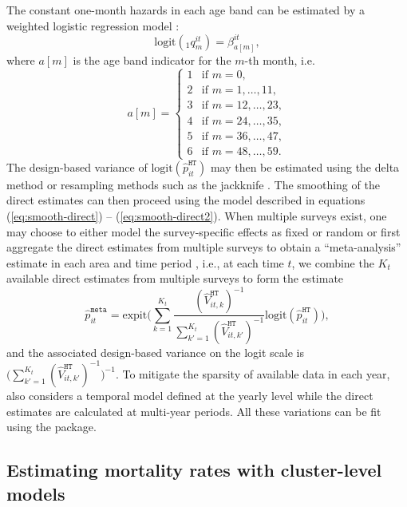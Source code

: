 The constant one-month hazards in each age band can be estimated by a weighted logistic regression model \citep{binder_83}:
\begin{equation}
\mbox{logit}\left(
{}_{1}{q}^{it}_{m}
\right) = \beta_{a[m]}^{it},
\end{equation}
where \(a[m]\) is the age band indicator for the \(m\)-th month, i.e.
\begin{equation}
a[m] = \left\{
\begin{array}{ll}
1 & \mbox{if }m=0,\\
2 & \mbox{if }m=1,\dots,11,\\
3 & \mbox{if }m=12,\dots,23,\\
4 & \mbox{if }m=24,\dots,35,\\
5 & \mbox{if }m=36,\dots,47,\\
6 & \mbox{if }m=48,\dots,59.
\end{array}
\right.
\label{eq:am}
\end{equation}
The design-based variance of \(\mbox{logit}(\hat p_{it}^{\texttt{HT}})\) may then be estimated using the delta method or resampling methods such as the jackknife \citep{pedersenandliu_2012}. The smoothing of the direct estimates can then proceed using the model described in equations (\ref{eq:smooth-direct}) -- (\ref{eq:smooth-direct2}). When multiple surveys exist, one may choose to either model the survey-specific effects as fixed or random \citep{mercer_etal_15} or first aggregate the direct estimates from multiple surveys to obtain a ``meta-analysis'' estimate in each area and time period \citep{li_etal_19}, i.e., at each time \(t\), we combine the \(K_t\) available direct estimates from multiple surveys to form the estimate
\[
  \hat p_{it}^{\texttt{meta}} = \mbox{expit}\Big(\sum_{k = 1}^{K_t} \frac{(\hat V_{it, k}^{\texttt{HT}})^{-1}}{\sum_{k'=1}^{K_t} (\hat V_{it, k'}^{\texttt{HT}})^{-1}} \mbox{logit}(\hat p_{it}^{\texttt{HT}}) \Big),
\]
and the associated design-based variance on the logit scale is \(\Big(\sum_{k'=1}^{K_t} (\hat V_{it, k'}^{\texttt{HT}})^{-1}\Big)^{-1}\).
To mitigate the sparsity of available data in each year, \citet{li_etal_19} also considers a temporal model defined at the yearly level while the direct estimates are calculated at multi-year periods. All these variations can be fit using the  package.

\subsection{Estimating mortality rates with cluster-level models}\label{sec:model-cluster}

